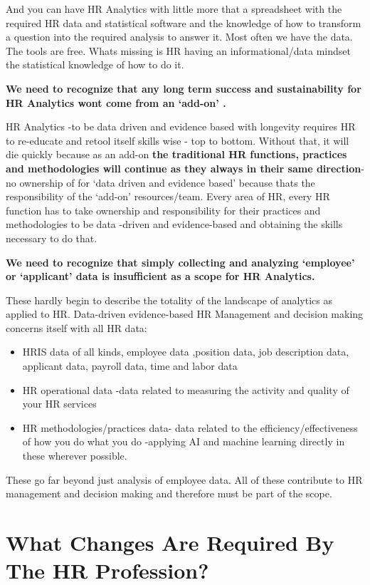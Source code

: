 \documentclass[12pt,letterpaper]{article}
\begin{document}
And you can have HR Analytics with little more that a spreadsheet with
the required HR data and statistical software and the knowledge of how
to transform a question into the required analysis to answer it. Most
often we have the data. The tools are free. Whats missing is HR having
an informational/data mindset the statistical knowledge of how to do it.

\textbf{We need to recognize that any long term success and
sustainability for HR Analytics wont come from an `add-on' .}

HR Analytics -to be data driven and evidence based with longevity
requires HR to re-educate and retool itself skills wise - top to bottom.
Without that, it will die quickly because as an add-on \textbf{the
traditional HR functions, practices and methodologies will continue as
they always in their same direction}- no ownership of for `data driven
and evidence based' because thats the responsibility of the `add-on'
resources/team. Every area of HR, every HR function has to take
ownership and responsibility for their practices and methodologies to be
data -driven and evidence-based and obtaining the skills necessary to do
that.

\textbf{We need to recognize that simply collecting and analyzing
`employee' or `applicant' data is insufficient as a scope for HR
Analytics.}

These hardly begin to describe the totality of the landscape of
analytics as applied to HR. Data-driven evidence-based HR Management and
decision making concerns itself with all HR data:

\begin{itemize}
\item
  HRIS data of all kinds, employee data ,position data, job description
  data, applicant data, payroll data, time and labor data
\item
  HR operational data -data related to measuring the activity and
  quality of your HR services
\item
  HR methodologies/practices data- data related to the
  efficiency/effectiveness of how you do what you do -applying AI and
  machine learning directly in these wherever possible.
\end{itemize}
  These go far beyond just analysis of employee data. All of these
  contribute to HR management and decision making and therefore must be
  part of the scope.


\section{What Changes Are Required By The HR
Profession?}\label{what-changes-are-required-by-the-hr-profession}
\end{document}
